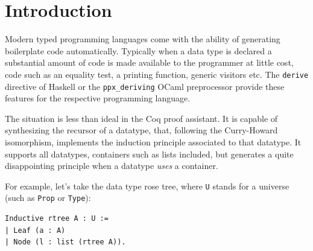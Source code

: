\documentclass[sigplan,10pt,review]{acmart}\settopmatter{printfolios=true,printccs=false,printacmref=false}
\begin{document}


\maketitle

\section{Introduction}

Modern typed programming languages come with the ability of generating
boilerplate code automatically. Typically when a data type is declared
a substantial amount of code is made available to the programmer at
little cost, code such as an equality test, a printing function,
generic visitors etc.  The \lstinline+derive+ directive of
Haskell or the
\lstinline+ppx_deriving+ OCaml preprocessor
provide these features for the respective programming language.

The situation is less than ideal in the Coq proof assistant.  It is
capable of synthesizing the recursor of a datatype, that,
following the Curry-Howard isomorphism, implements the induction
principle associated to that datatype. It supports all datatypes,
containers such as lists included, but generates a quite disappointing
principle when a datatype \emph{uses} a container.

For example, let's take the data type rose tree, where \lstinline+U+
stands for a universe (such as \lstinline+Prop+ or \lstinline+Type+):

\begin{minipage}{\textwidth}\begin{lstlisting}
Inductive rtree A : U :=
| Leaf (a : A)
| Node (l : list (rtree A)).
\end{lstlisting}\end{minipage}
\end{document}
